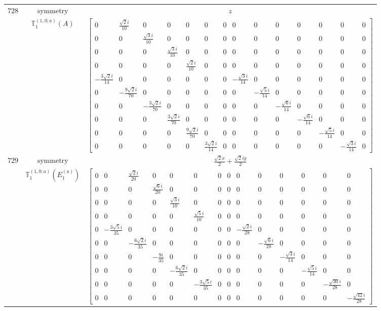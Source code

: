 \documentclass[fleqn,8pt,landscape]{jsarticle}
\begin{document}
\begin{longtable}{ccc}
$ 728 $ & $ \text{symmetry} $ & $ z $ \\
$  $ & $ \mathbb{T}_{1}^{(1,0;a)}(A) $ & $ \begin{bmatrix} 0 & \frac{\sqrt{2} i}{10} & 0 & 0 & 0 & 0 & 0 & 0 & 0 & 0 & 0 & 0 & 0 & 0 \\ 0 & 0 & \frac{\sqrt{3} i}{10} & 0 & 0 & 0 & 0 & 0 & 0 & 0 & 0 & 0 & 0 & 0 \\ 0 & 0 & 0 & \frac{\sqrt{3} i}{10} & 0 & 0 & 0 & 0 & 0 & 0 & 0 & 0 & 0 & 0 \\ 0 & 0 & 0 & 0 & \frac{\sqrt{2} i}{10} & 0 & 0 & 0 & 0 & 0 & 0 & 0 & 0 & 0 \\ - \frac{3 \sqrt{2} i}{14} & 0 & 0 & 0 & 0 & 0 & 0 & - \frac{\sqrt{3} i}{14} & 0 & 0 & 0 & 0 & 0 & 0 \\ 0 & - \frac{9 \sqrt{2} i}{70} & 0 & 0 & 0 & 0 & 0 & 0 & - \frac{\sqrt{5} i}{14} & 0 & 0 & 0 & 0 & 0 \\ 0 & 0 & - \frac{3 \sqrt{2} i}{70} & 0 & 0 & 0 & 0 & 0 & 0 & - \frac{\sqrt{6} i}{14} & 0 & 0 & 0 & 0 \\ 0 & 0 & 0 & \frac{3 \sqrt{2} i}{70} & 0 & 0 & 0 & 0 & 0 & 0 & - \frac{\sqrt{6} i}{14} & 0 & 0 & 0 \\ 0 & 0 & 0 & 0 & \frac{9 \sqrt{2} i}{70} & 0 & 0 & 0 & 0 & 0 & 0 & - \frac{\sqrt{5} i}{14} & 0 & 0 \\ 0 & 0 & 0 & 0 & 0 & \frac{3 \sqrt{2} i}{14} & 0 & 0 & 0 & 0 & 0 & 0 & - \frac{\sqrt{3} i}{14} & 0 \end{bmatrix} $ \\ \hline
$ 729 $ & $ \text{symmetry} $ & $ \frac{\sqrt{2} x}{2} + \frac{\sqrt{2} i y}{2} $ \\
$  $ & $ \mathbb{T}_{1}^{(1,0;a)}(E_{1}^{(a)}) $ & $ \begin{bmatrix} 0 & 0 & \frac{\sqrt{2} i}{20} & 0 & 0 & 0 & 0 & 0 & 0 & 0 & 0 & 0 & 0 & 0 \\ 0 & 0 & 0 & \frac{\sqrt{6} i}{20} & 0 & 0 & 0 & 0 & 0 & 0 & 0 & 0 & 0 & 0 \\ 0 & 0 & 0 & 0 & \frac{\sqrt{3} i}{10} & 0 & 0 & 0 & 0 & 0 & 0 & 0 & 0 & 0 \\ 0 & 0 & 0 & 0 & 0 & \frac{\sqrt{5} i}{10} & 0 & 0 & 0 & 0 & 0 & 0 & 0 & 0 \\ 0 & - \frac{3 \sqrt{5} i}{35} & 0 & 0 & 0 & 0 & 0 & 0 & - \frac{\sqrt{2} i}{28} & 0 & 0 & 0 & 0 & 0 \\ 0 & 0 & - \frac{6 \sqrt{2} i}{35} & 0 & 0 & 0 & 0 & 0 & 0 & - \frac{\sqrt{6} i}{28} & 0 & 0 & 0 & 0 \\ 0 & 0 & 0 & - \frac{9 i}{35} & 0 & 0 & 0 & 0 & 0 & 0 & - \frac{\sqrt{3} i}{14} & 0 & 0 & 0 \\ 0 & 0 & 0 & 0 & - \frac{6 \sqrt{2} i}{35} & 0 & 0 & 0 & 0 & 0 & 0 & - \frac{\sqrt{5} i}{14} & 0 & 0 \\ 0 & 0 & 0 & 0 & 0 & - \frac{3 \sqrt{5} i}{35} & 0 & 0 & 0 & 0 & 0 & 0 & - \frac{\sqrt{30} i}{28} & 0 \\ 0 & 0 & 0 & 0 & 0 & 0 & 0 & 0 & 0 & 0 & 0 & 0 & 0 & - \frac{\sqrt{42} i}{28} \end{bmatrix} $ \\ \hline

\end{longtable}
\end{document}

